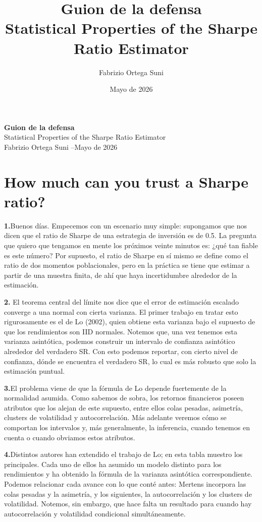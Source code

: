 \documentclass[11pt,a4paper]{article}
\title{\textbf{Guion de la defensa}\\[4pt]
  \large Statistical Properties of the Sharpe Ratio Estimator}
\author{Fabrizio Ortega Suni}
\date{Mayo de 2026}
\newcommand{\seccionrule}{\vspace{-0.6em}{\color{accentblue}\hrule height 0.8pt}\vspace{0.8em}}
\newcommand{\diapo}[2]{%
  \par\medskip\noindent%
  \textbf{\textcolor{accentblue}{#1.}}\enspace #2\par\smallskip}
\begin{document}
\begin{center}
  {\LARGE\bfseries\textcolor{accentblue}{Guion de la defensa}}\\[6pt]
  {\large Statistical Properties of the Sharpe Ratio Estimator}\\[2pt]
  {\normalsize Fabrizio Ortega Suni \quad--\quad Mayo de 2026}
\end{center}

\vspace{0.6em}
\seccionrule

\section*{How much can you trust a Sharpe ratio?}

\diapo{1}{Buenos días.
Empecemos con un escenario muy simple: supongamos que nos dicen que el
ratio de Sharpe de una estrategia de inversión es de 0.5. La pregunta que
quiero que tengamos en mente los próximos veinte minutos es: ¿qué tan
fiable es este número? Por supuesto, el ratio de Sharpe en sí mismo se
define como el ratio de dos momentos poblacionales, pero en la práctica
se tiene que estimar a partir de una muestra finita, de ahí que haya incertidumbre
alrededor de la estimación.}

\diapo{2}{
El teorema central del límite nos dice que el error de estimación
escalado converge a una normal con cierta varianza. El primer trabajo en
tratar esto rigurosamente es el de Lo (2002), quien obtiene esta varianza
bajo el supuesto de que los rendimientos son IID normales.
Notemos que, una vez tenemos esta varianza asintótica, podemos construir
un intervalo de confianza asintótico alrededor del verdadero SR. Con esto
podemos reportar, con cierto nivel de confianza, dónde se encuentra el
verdadero SR, lo cual es más robusto que solo la estimación puntual.}

\diapo{3}{El problema viene de que la fórmula de Lo depende fuertemente
de la normalidad asumida. Como sabemos de sobra, los retornos financieros
poseen atributos que los alejan de este supuesto, entre ellos colas
pesadas, asimetría, clusters de volatilidad y autocorrelación. Más
adelante veremos cómo se comportan los intervalos y, más generalmente, la
inferencia, cuando tenemos en cuenta o cuando obviamos estos atributos.}

\diapo{4}{Distintos autores han extendido el trabajo de Lo; en esta tabla
muestro los principales. Cada uno de ellos ha asumido un modelo distinto
para los rendimientos y ha obtenido la fórmula de la varianza asintótica
correspondiente. Podemos relacionar cada avance con lo que conté antes:
Mertens incorpora las colas pesadas y la asimetría, y los siguientes, la
autocorrelación y los clusters de volatilidad.
Notemos, sin embargo, que hace falta un resultado para cuando hay
autocorrelación y volatilidad condicional simultáneamente.}
\end{document}
